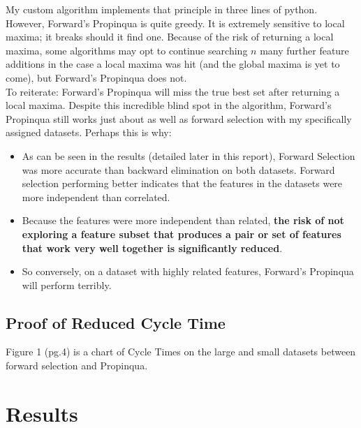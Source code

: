\documentclass{article}
\begin{document}
My custom algorithm implements that principle in three lines of python. However,
Forward's Propinqua is quite greedy. It is extremely sensitive to local maxima; it breaks should it find
one. Because of the risk of returning a local maxima, some algorithms may opt to
continue searching $n$ many further feature additions in the case a local maxima
was hit (and the global maxima is yet to come), but Forward's Propinqua does not. \\

To reiterate: Forward's Propinqua will miss the true best set after returning a
local maxima. Despite this incredible blind spot in the algorithm, Forward's
Propinqua still works just about as well as forward selection with my specifically assigned datasets. Perhaps this is why:
\begin{itemize}
\item As can be seen in the results (detailed later in this report), Forward
  Selection was more accurate than backward elimination on both datasets. Forward selection performing better indicates that the features in the
  datasets were more independent than correlated.
\item Because the features were more independent than related, \textbf{the risk
    of not exploring a feature subset that produces a pair or set of features that work
    very well together is significantly reduced}.
\item So conversely, on a dataset with highly related features, Forward's
  Propinqua will perform terribly.
\end{itemize}

\subsection{Proof of Reduced Cycle Time}

Figure 1 (pg.4) is a chart of Cycle Times on the large and small datasets between forward
selection and Propinqua.

\section{Results}
\end{document}
